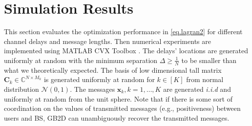 \documentclass[conference,10pt]{IEEEtran}
\theoremstyle{remark}
\theoremstyle{plain}
\theoremstyle{definition}
\theoremstyle{remark}
\begin{document}





\section{Simulation Results}\label{sec.simulations}
This section evaluates the optimization performance in \eqref{eq.lagran2} for different channel delays and message lengths. Then numerical experiments are implemented using MATLAB CVX Toolbox \cite{grant2014cvx}.  The delays' locations are generated uniformly at random with the minimum separation $\Delta\geq \frac{1}{N}$ to be smaller than what we theoretically expected.  The basis of low  
dimensional tall matrix $\bm{C}_k\in \mathbb{C}^{ N \times M_k}$ is generated uniformly at random for $k\in [K]$ from normal distribution $\mathcal{N}(0,1)$. The messages $\bm{x}_k, k=1, \ldots, K$ are generated \textit{i.i.d} and uniformly at random  from the unit sphere. Note that if there is some sort of coordination on the values of transmitted messages (e.g., positiveness) between users and \ac{BS}, \ac{GB2D} can unambiguously recover the transmitted messages.   
\end{document}

